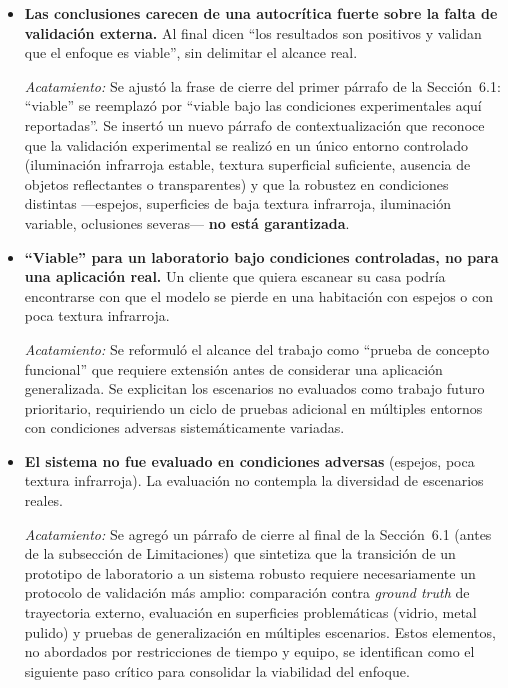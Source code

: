 \documentclass[12pt, a4paper]{article}
\begin{document}
\begin{itemize}[leftmargin=*, itemsep=1em]

\item \textbf{Las conclusiones carecen de una autocrítica fuerte sobre la falta de validación externa.} Al final dicen ``los resultados son positivos y validan que el enfoque es viable'', sin delimitar el alcance real.

\textit{Acatamiento:} Se ajustó la frase de cierre del primer párrafo de la Sección~6.1: ``viable'' se reemplazó por ``viable bajo las condiciones experimentales aquí reportadas''. Se insertó un nuevo párrafo de contextualización que reconoce que la validación experimental se realizó en un único entorno controlado (iluminación infrarroja estable, textura superficial suficiente, ausencia de objetos reflectantes o transparentes) y que la robustez en condiciones distintas —espejos, superficies de baja textura infrarroja, iluminación variable, oclusiones severas— \textbf{no está garantizada}.

\item \textbf{``Viable'' para un laboratorio bajo condiciones controladas, no para una aplicación real.} Un cliente que quiera escanear su casa podría encontrarse con que el modelo se pierde en una habitación con espejos o con poca textura infrarroja.

\textit{Acatamiento:} Se reformuló el alcance del trabajo como ``prueba de concepto funcional'' que requiere extensión antes de considerar una aplicación generalizada. Se explicitan los escenarios no evaluados como trabajo futuro prioritario, requiriendo un ciclo de pruebas adicional en múltiples entornos con condiciones adversas sistemáticamente variadas.

\item \textbf{El sistema no fue evaluado en condiciones adversas} (espejos, poca textura infrarroja). La evaluación no contempla la diversidad de escenarios reales.

\textit{Acatamiento:} Se agregó un párrafo de cierre al final de la Sección~6.1 (antes de la subsección de Limitaciones) que sintetiza que la transición de un prototipo de laboratorio a un sistema robusto requiere necesariamente un protocolo de validación más amplio: comparación contra \textit{ground truth} de trayectoria externo, evaluación en superficies problemáticas (vidrio, metal pulido) y pruebas de generalización en múltiples escenarios. Estos elementos, no abordados por restricciones de tiempo y equipo, se identifican como el siguiente paso crítico para consolidar la viabilidad del enfoque.

\end{itemize}
\end{document}
